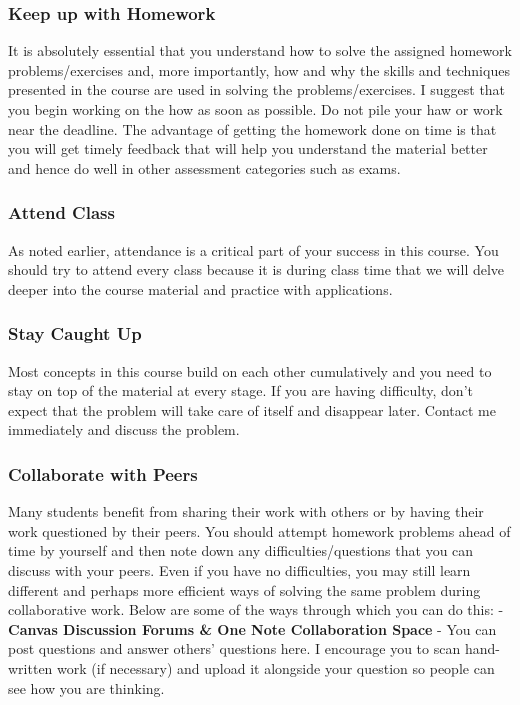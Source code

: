 \documentclass[
  letterpaper,
  DIV=11,
  numbers=noendperiod]{scrartcl}
\begin{document}
\subsubsection{Keep up with Homework}\label{keep-up-with-homework}

It is absolutely essential that you understand how to solve the assigned
homework problems/exercises and, more importantly, how and why the
skills and techniques presented in the course are used in solving the
problems/exercises. I suggest that you begin working on the how as soon
as possible. Do not pile your haw or work near the deadline. The
advantage of getting the homework done on time is that you will get
timely feedback that will help you understand the material better and
hence do well in other assessment categories such as exams.

\subsubsection{Attend Class}\label{attend-class}

As noted earlier, attendance is a critical part of your success in this
course. You should try to attend every class because it is during class
time that we will delve deeper into the course material and practice
with applications.

\subsubsection{Stay Caught Up}\label{stay-caught-up}

Most concepts in this course build on each other cumulatively and you
need to stay on top of the material at every stage. If you are having
difficulty, don't expect that the problem will take care of itself and
disappear later. Contact me immediately and discuss the problem.

\subsubsection{Collaborate with Peers}\label{collaborate-with-peers}

Many students benefit from sharing their work with others or by having
their work questioned by their peers. You should attempt homework
problems ahead of time by yourself and then note down any
difficulties/questions that you can discuss with your peers. Even if you
have no difficulties, you may still learn different and perhaps more
efficient ways of solving the same problem during collaborative work.
Below are some of the ways through which you can do this: -
\textbf{Canvas Discussion Forums \& One Note Collaboration Space} - You
can post questions and answer others' questions here. I encourage you to
scan hand-written work (if necessary) and upload it alongside your
question so people can see how you are thinking.
\end{document}
